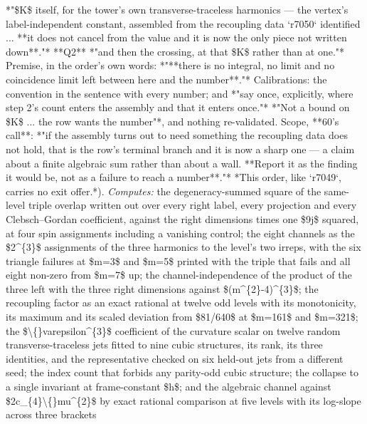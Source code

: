 \begin{description}
*"\$K\$ itself, for the tower's own transverse-traceless harmonics --- the vertex's label-independent constant, assembled from the recoupling data `r7050` identified ... **it does not cancel from the value and it is now the only piece not written down**."* **Q2** *"and then the crossing, at that \$K\$ rather than at one."* Premise, in the order's own words: *"**there is no integral, no limit and no coincidence limit left between here and the number**."*  Calibrations: the convention in the sentence with every number; and *"say once, explicitly, where step 2's count enters the assembly and that it enters once."*  *"Not a bound on \$K\$ ... the row wants the number"*, and nothing re-validated.  Scope, **60's call**: *"if the assembly turns out to need something the recoupling data does not hold, that is the row's terminal branch and it is now a sharp one --- a claim about a finite algebraic sum rather than about a wall. **Report it as the finding it would be, not as a failure to reach a number**."*  *This order, like `r7049`, carries no exit offer.*). 
\emph{Computes:} the degeneracy-summed square of the same-level triple overlap written out over every right label, every projection and every Clebsch--Gordan coefficient, against the right dimensions times one \$9j\$ squared, at four spin assignments including a vanishing control; the eight channels as the \$2\textasciicircum{}\{3\}\$ assignments of the three harmonics to the level's two irreps, with the six triangle failures at \$m=3\$ and \$m=5\$ printed with the triple that fails and all eight non-zero from \$m=7\$ up; the channel-independence of the product of the three left with the three right dimensions against \$(m\textasciicircum{}\{2\}-4)\textasciicircum{}\{3\}\$; the recoupling factor as an exact rational at twelve odd levels with its monotonicity, its maximum and its scaled deviation from \$81/640\$ at \$m=161\$ and \$m=321\$; the \$\textbackslash\{\}varepsilon\textasciicircum{}\{3\}\$ coefficient of the curvature scalar on twelve random transverse-traceless jets fitted to nine cubic structures, its rank, its three identities, and the representative checked on six held-out jets from a different seed; the index count that forbids any parity-odd cubic structure; the collapse to a single invariant at frame-constant \$h\$; and the algebraic channel against \$2c\_\{4\}\textbackslash\{\}mu\textasciicircum{}\{2\}\$ by exact rational comparison at five levels with its log-slope across three brackets

\end{description}
